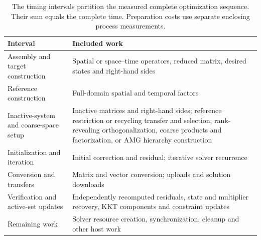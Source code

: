 \begin{table}[pos=H]
\centering\small
\caption{The timing intervals partition the measured complete
optimization sequence. Their sum equals the complete time.
Preparation costs use separate enclosing process measurements.}
\label{si:tab_timing_definitions}
\begin{tabularx}{\textwidth}{@{}p{}X@{}}
\toprule
Interval & Included work \\
\midrule
Assembly and target construction &
Spatial or space--time operators, reduced matrix, desired states
and right-hand sides \\
Reference construction &
Full-domain spatial and temporal factors \\
Inactive-system and coarse-space setup &
Inactive matrices and right-hand sides; reference restriction or
recycling transfer and selection; rank-revealing orthogonalization,
coarse products and factorization, or AMG hierarchy construction \\
Initialization and iteration &
Initial correction and residual; iterative solver recurrence \\
Conversion and transfers &
Matrix and vector conversion; uploads and solution downloads \\
Verification and active-set updates &
Independently recomputed residuals, state and multiplier recovery,
KKT components and constraint updates \\
Remaining work &
Solver resource creation, synchronization, cleanup and other host work \\
\bottomrule
\end{tabularx}
\end{table}